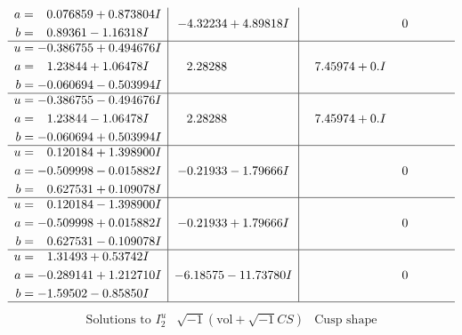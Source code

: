 \documentclass[1p]{elsarticle_modified}
\theoremstyle{definition}
\newcommand{\I}{\sqrt{-1}}
\begin{document}
$$\begin{array}{c|c|c}
\begin{aligned}
a &= \phantom{-}0.076859 + 0.873804 I \\
b &= \phantom{-}0.89361 - 1.16318 I\end{aligned}
 & -4.32234 + 4.89818 I & \phantom{-0.000000 } 0 \\ \hline\begin{aligned}
u &= -0.386755 + 0.494676 I \\
a &= \phantom{-}1.23844 + 1.06478 I \\
b &= -0.060694 - 0.503994 I\end{aligned}
 & \phantom{-}2.28288\phantom{ +0.000000I} & \phantom{-}7.45974 + 0. I\phantom{ +0.000000I} \\ \hline\begin{aligned}
u &= -0.386755 - 0.494676 I \\
a &= \phantom{-}1.23844 - 1.06478 I \\
b &= -0.060694 + 0.503994 I\end{aligned}
 & \phantom{-}2.28288\phantom{ +0.000000I} & \phantom{-}7.45974 + 0. I\phantom{ +0.000000I} \\ \hline\begin{aligned}
u &= \phantom{-}0.120184 + 1.398900 I \\
a &= -0.509998 - 0.015882 I \\
b &= \phantom{-}0.627531 + 0.109078 I\end{aligned}
 & -0.21933 - 1.79666 I & \phantom{-0.000000 } 0 \\ \hline\begin{aligned}
u &= \phantom{-}0.120184 - 1.398900 I \\
a &= -0.509998 + 0.015882 I \\
b &= \phantom{-}0.627531 - 0.109078 I\end{aligned}
 & -0.21933 + 1.79666 I & \phantom{-0.000000 } 0 \\ \hline\begin{aligned}
u &= \phantom{-}1.31493 + 0.53742 I \\
a &= -0.289141 + 1.212710 I \\
b &= -1.59502 - 0.85850 I\end{aligned}
 & -6.18575 - 11.73780 I & \phantom{-0.000000 } 0\\
 \hline 
 \end{array}$$\newpage$$\begin{array}{c|c|c}  
\text{Solutions to }I^u_{2}& \I (\text{vol} + \sqrt{-1}CS) & \text{Cusp shape}\\
 \hline 
\begin{aligned}

\end{aligned}
\end{array}$$
\end{document}
